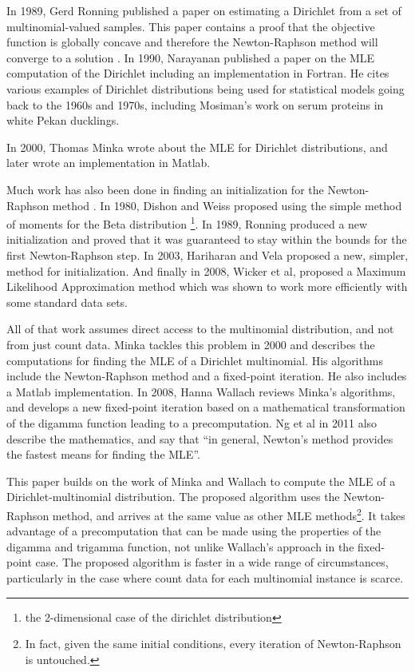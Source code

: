 \documentclass[twoside]{article}
\begin{document}
In 1989, Gerd Ronning published a paper on estimating a Dirichlet from a set of multinomial-valued samples\cite{ronning}.  This paper contains a proof that the objective function is globally concave and therefore the Newton-Raphson method will converge to a solution \cite[pg 73]{ng}.  In 1990, Narayanan published a paper on the MLE computation of the Dirichlet including an implementation in Fortran\cite{narayanan}. He cites various examples of Dirichlet distributions being used for statistical models going back to the 1960s and 1970s, including Mosiman's work on serum proteins in white Pekan ducklings\cite[pg 8]{ng}.

In 2000, Thomas Minka\cite{minka} wrote about the MLE for Dirichlet distributions, and later wrote an implementation in Matlab.

Much work has also been done in finding an initialization for the Newton-Raphson method \cite[pg 74-54]{ng}.  In 1980, Dishon and Weiss\cite{dishon} proposed using the simple method of moments for the Beta distribution \footnote{the 2-dimensional case of the dirichlet distribution}.  In 1989, Ronning\cite{ronning} produced a new initialization and proved that it was guaranteed to stay within the bounds for the first Newton-Raphson step.  In 2003, Hariharan and Vela\cite{hariharan} proposed a new, simpler, method for initialization.  And finally in 2008, Wicker et al\cite{wicker}, proposed a Maximum Likelihood Approximation method which was shown to work more efficiently with some standard data sets.

All of that work assumes direct access to the multinomial distribution, and not from just count data.  Minka\cite{minka} tackles this problem in 2000 and describes the computations for finding the MLE of a Dirichlet multinomial.   His algorithms include the Newton-Raphson method and a fixed-point iteration.  He also includes a Matlab implementation.  In 2008, Hanna Wallach reviews Minka's algorithms, and develops a new fixed-point iteration based on a mathematical transformation of the digamma function leading to a precomputation.  Ng et al\cite{ng} in 2011 also describe the mathematics, and say that ``in general, Newton's method provides the fastest means for finding the MLE''.

This paper builds on the work of Minka and Wallach to compute the MLE of a Dirichlet-multinomial distribution.  The proposed algorithm uses the Newton-Raphson method, and arrives at the same value as other MLE methods\footnote{In fact, given the same initial conditions, every iteration of Newton-Raphson is untouched.}.  It takes advantage of a precomputation that can be made using the properties of the digamma and trigamma function, not unlike Wallach's approach in the fixed-point case.  The proposed algorithm is faster in a wide range of circumstances, particularly in the case where count data for each multinomial instance is scarce.
\end{document}

